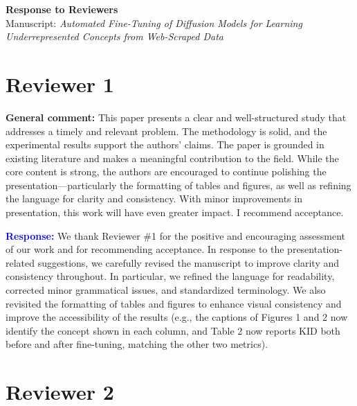 \documentclass[11pt]{article}
\begin{document}
\begin{center}
{\Large \textbf{Response to Reviewers}}\\
\vspace{0.5em}
Manuscript: \textit{Automated Fine-Tuning of Diffusion Models for Learning Underrepresented Concepts from Web-Scraped Data}
\end{center}

\vspace{1em}

\section*{Reviewer 1}

\noindent \textbf{General comment:} This paper presents a clear and well-structured study that addresses a timely and relevant problem. The methodology is solid, and the experimental results support the authors' claims. The paper is grounded in existing literature and makes a meaningful contribution to the field. While the core content is strong, the authors are encouraged to continue polishing the presentation---particularly the formatting of tables and figures, as well as refining the language for clarity and consistency. With minor improvements in presentation, this work will have even greater impact. I recommend acceptance.

\vspace{0.75em}
\noindent \textbf{\textcolor{blue}{Response:}} We thank Reviewer \#1 for the positive and encouraging assessment of our work and for recommending acceptance. In response to the presentation-related suggestions, we carefully revised the manuscript to improve clarity and consistency throughout. In particular, we refined the language for readability, corrected minor grammatical issues, and standardized terminology. We also revisited the formatting of tables and figures to enhance visual consistency and improve the accessibility of the results (e.g., the captions of Figures 1 and 2 now identify the concept shown in each column, and Table 2 now reports KID both before and after fine-tuning, matching the other two metrics).

\vspace{1em}

\section*{Reviewer 2}
\end{document}
